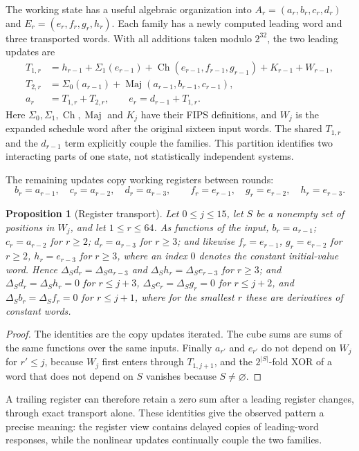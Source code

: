 \documentclass[11pt]{article}
\newtheorem{proposition}{Proposition}
\begin{document}
The working state has a useful algebraic organization into $A_r=(a_r,b_r,c_r,d_r)$ and $E_r=(e_r,f_r,g_r,h_r)$. Each family has a newly computed leading word and three transported words. With all additions taken modulo $2^{32}$, the two leading updates are~\cite{nist}
\begin{align}
 T_{1,r}&=h_{r-1}+\Sigma_1(e_{r-1})+\operatorname{Ch}(e_{r-1},f_{r-1},g_{r-1})+K_{r-1}+W_{r-1},\\
 T_{2,r}&=\Sigma_0(a_{r-1})+\operatorname{Maj}(a_{r-1},b_{r-1},c_{r-1}),\\
 a_r&=T_{1,r}+T_{2,r},\qquad e_r=d_{r-1}+T_{1,r}.
\end{align}
Here $\Sigma_0,\Sigma_1,\operatorname{Ch},\operatorname{Maj}$ and $K_j$ have their FIPS definitions, and $W_j$ is the expanded schedule word after the original sixteen input words. The shared $T_{1,r}$ and the $d_{r-1}$ term explicitly couple the families. This partition identifies two interacting parts of one state, not statistically independent systems.

The remaining updates copy working registers between rounds:
\begin{equation}
 b_r=a_{r-1},\quad c_r=a_{r-2},\quad d_r=a_{r-3},\qquad
 f_r=e_{r-1},\quad g_r=e_{r-2},\quad h_r=e_{r-3}.
\end{equation}
\begin{proposition}[Register transport]\label{prop:transport}
Let $0\le j\le15$, let $S$ be a nonempty set of positions in $W_j$, and let $1\le r\le64$. As functions of the input, $b_r=a_{r-1}$; $c_r=a_{r-2}$ for $r\ge2$; $d_r=a_{r-3}$ for $r\ge3$; and likewise $f_r=e_{r-1}$, $g_r=e_{r-2}$ for $r\ge2$, $h_r=e_{r-3}$ for $r\ge3$, where an index $0$ denotes the constant initial-value word. Hence $\Delta_S d_r=\Delta_S a_{r-3}$ and $\Delta_S h_r=\Delta_S e_{r-3}$ for $r\ge3$; and $\Delta_S d_r=\Delta_S h_r=0$ for $r\le j+3$, $\Delta_S c_r=\Delta_S g_r=0$ for $r\le j+2$, and $\Delta_S b_r=\Delta_S f_r=0$ for $r\le j+1$, where for the smallest $r$ these are derivatives of constant words.
\end{proposition}
\begin{proof}
The identities are the copy updates iterated. The cube sums are sums of the same functions over the same inputs. Finally $a_{r'}$ and $e_{r'}$ do not depend on $W_j$ for $r'\le j$, because $W_j$ first enters through $T_{1,j+1}$, and the $2^{|S|}$-fold XOR of a word that does not depend on $S$ vanishes because $S\neq\varnothing$.
\end{proof}
A trailing register can therefore retain a zero sum after a leading register changes, through exact transport alone. These identities give the observed pattern a precise meaning: the register view contains delayed copies of leading-word responses, while the nonlinear updates continually couple the two families.
\end{document}
